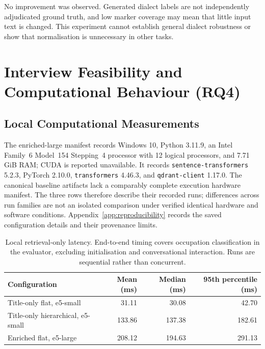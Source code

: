No improvement was observed. Generated dialect labels are not independently
adjudicated ground truth, and low marker coverage may mean that little
input text is changed. This experiment cannot establish general dialect
robustness or show that normalisation is unnecessary in other tasks.

\section{Interview Feasibility and Computational Behaviour (RQ4)}
\label{sec:res-efficiency}

\subsection{Local Computational Measurements}

The enriched-large manifest records Windows 10, Python 3.11.9, an Intel
Family~6 Model~154 Stepping~4 processor with 12 logical processors, and
7.71 GiB RAM; CUDA is reported unavailable. It records
\texttt{sentence-transformers} 5.2.3, PyTorch 2.10.0,
\texttt{transformers} 4.46.3, and \texttt{qdrant-client} 1.17.0.
The canonical baseline artifacts lack a comparably complete execution
hardware manifest. The three rows therefore describe their recorded runs;
differences across run families are not an isolated comparison under
verified identical hardware and software conditions.
Appendix~\ref{app:reproducibility} records the saved configuration details
and their provenance limits.

\begin{table}[htbp]
\centering
\caption{Local retrieval-only latency. End-to-end timing covers occupation
classification in the evaluator, excluding initialisation and conversational
interaction. Runs are sequential rather than concurrent.}
\label{tab:ch6-efficiency}
\small\renewcommand{\arraystretch}{1.3}
\begin{tabular}{lrrr}
\toprule
\textbf{Configuration} & \textbf{Mean (ms)} & \textbf{Median (ms)} & \textbf{95th percentile (ms)} \\
\midrule
Title-only flat, e5-small & 31.11 & 30.08 & 42.70 \\
Title-only hierarchical, e5-small & 133.86 & 137.38 & 182.61 \\
Enriched flat, e5-large & 208.12 & 194.63 & 291.13 \\
\bottomrule
\end{tabular}
\end{table}


